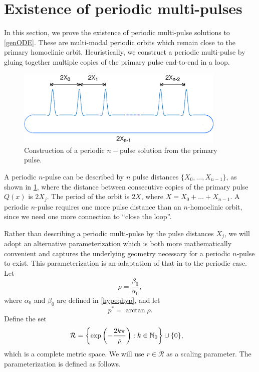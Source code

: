 \documentclass[11pt,reqno]{amsart}
\theoremstyle{plain}
\theoremstyle{definition}
\theoremstyle{remark}
\begin{document}
\section{Existence of periodic multi-pulses}\label{sec:perexist}

In this section, we prove the existence of periodic multi-pulse solutions to \cref{genODE}. These are multi-modal periodic orbits which remain close to the primary homoclinic orbit. Heuristically, we construct a periodic multi-pulse by gluing together multiple copies of the primary pulse end-to-end in a loop.
\begin{figure}[H]
\begin{center}
\includegraphics[width=10cm]{images/multipulseperiodic}
\end{center}
\caption[Construction of a periodic $n$-pulse solution]{Construction of a periodic $n-$pulse solution from the primary pulse.}
\label{fig:permultipulse}
\end{figure}
A periodic $n$-pulse can be described by $n$ pulse distances $\{X_0, \dots, X_{n-1} \}$, as shown in \cref{fig:permultipulse}, where the distance between consecutive copies of the primary pulse $Q(x)$ is $2 X_j$. The period of the orbit is $2X$, where $X = X_0 + \dots + X_{n-1}$. A periodic $n$-pulse requires one more pulse distance than an $n$-homoclinic orbit, since we need one more connection to ``close the loop''.  

Rather than describing a periodic multi-pulse by the pulse distances $X_j$, we will adopt an alternative parameterization which is both more mathematically convenient and captures the underlying geometry necessary for a periodic $n$-pulse to exist. This parameterization is an adaptation of that in \cite{SandstedeStrut,Sandstede1998} to the periodic case. Let
\begin{equation}\label{defrho}
\rho = \frac{\beta_0}{\alpha_0},
\end{equation}
where $\alpha_0$ and $\beta_0$ are defined in \cref{hypeqhyp}, and let
\begin{equation}\label{pstar}
p^* = \arctan \rho.
\end{equation}
Define the set
\begin{align}
\mathcal{R} &= \left\{ \mathop\mathrm{exp}\nolimits\left(-\frac{2 k \pi}{\rho}\right) : k \in \mathbb{N}_0 \right\} \cup \{ 0 \},
\end{align}
which is a complete metric space. We will use $r \in \mathcal{R}$ as a scaling parameter. The parameterization is defined as follows.
\end{document}
